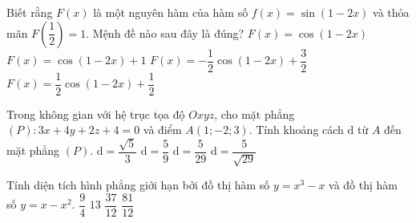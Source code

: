 \begin{ex}%
Biết rằng $F(x)$ là một nguyên hàm của hàm số $f(x)=\sin(1-2x)$ và thỏa mãn $F\left(\dfrac{1}{2}\right)=1$. Mệnh đề nào sau đây là đúng?
\choice
{$F(x)=\cos(1-2x)$}
{$F(x)=\cos(1-2x)+1$}
{$F(x)=-\dfrac{1}{2}\cos(1-2x)+\dfrac{3}{2}$}
{\True $F(x)=\dfrac{1}{2}\cos(1-2x)+\dfrac{1}{2}$}
\end{ex}

\begin{ex}%
Trong không gian với hệ trục tọa độ $Oxyz$, cho mặt phẳng $(P)\colon 3x+4y+2z+4=0$ và điểm $A(1;-2;3)$. Tính khoảng cách $\mathrm{d}$ từ $A$ đến mặt phẳng $(P)$.
\choice
{$\mathrm{d}=\dfrac{\sqrt5}{3}$}
{$\mathrm{d}=\dfrac{5}{9}$}
{$\mathrm{d}=\dfrac{5}{29}$}
{\True $\mathrm{d}=\dfrac{5}{\sqrt{29}}$}
\end{ex}

\begin{ex}%
Tính diện tích hình phẳng giới hạn bởi đồ thị hàm số $y=x^3-x$ và đồ thị hàm số $y=x-x^2$.
\choice
{$\dfrac{9}{4}$}
{$13$}
{\True $\dfrac{37}{12}$}
{$\dfrac{81}{12}$}
\end{ex}

